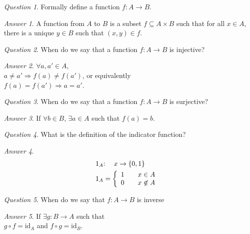 \documentclass[]{article}
\theoremstyle{remark}
\theoremstyle{qnstyle}
\newtheorem{question}{Question}
\theoremstyle{answerstyle}
\newtheorem*{answer}{Answer}
\begin{document}
\begin{question}
    Formally define a function $f: A \to B$.
\end{question}
\begin{answer}
    A function from $A$ to $B$ is a subset $f \subseteq A \times B$ such that
    for all $x \in A$, there is a unique $y \in B$ such that $(x,y) \in f$.
\end{answer}

\begin{question}
    When do we say that a function $f: A \to B$ is injective?
\end{question}
\begin{answer}
    $\forall a, a' \in A$, \\
    $a \not = a' \Rightarrow f(a) \not = f(a')$, or equivalently \\
    $f(a) = f(a') \Rightarrow a = a'$.
\end{answer}

\begin{question}
    When do we say that a function $f: A \to B$ is surjective?
\end{question}
\begin{answer}
    If $\forall b \in B$, $\exists a \in A$ such that $f(a) = b$.
\end{answer}

\begin{question}
    What is the definition of the indicator function?
\end{question}
\begin{answer}
    \begin{align*}
        1_A & \mkern-5mu:  \quad x \to \{0, 1\} \\
        1_A & = \left\{
            \begin{array}{ll}
                1 & \quad x \in A \\
                0 & \quad x \not \in A
            \end{array}
        \right.
    \end{align*}
\end{answer}

\begin{question}
    When do we say that $f: A \to B$ is inverse
\end{question}
\begin{answer}
    If $\exists g: B \to A$ such that \\
    $g \circ f = \text{id}_A$ and $f \circ g = \text{id}_B$.
\end{answer}
\end{document}
